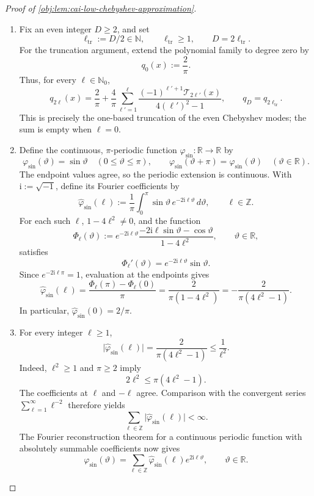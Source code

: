 \begin{proof}[Proof of \cref{obj:lem:cai-low-chebyshev-approximation}]
\begin{enumerate}
\item Fix an even integer \(D\ge2\), and set
\[
\ell_{\mathrm{tr}}:=D/2\in\mathbb N,\qquad
\ell_{\mathrm{tr}}\ge1,\qquad D=2\ell_{\mathrm{tr}}.
\]
For the truncation argument, extend the polynomial family to degree zero by
\[
q_0(x):=\frac2\pi.
\]
Thus, for every \(\ell\in\mathbb N_0\),
\[
q_{2\ell}(x)
=\frac2\pi+\frac4\pi\sum_{\ell'=1}^{\ell}
 \frac{(-1)^{\ell'+1}\mathcal T_{2\ell'}(x)}
 {4(\ell')^2-1},
\qquad q_D=q_{2\ell_{\mathrm{tr}}}.
\]
This is precisely the one-based truncation of the even Chebyshev modes; the sum is empty when \(\ell=0\).

\item Define the continuous, \(\pi\)-periodic function \(\varphi_{\sin}:\mathbb R\to\mathbb R\) by
\[
\varphi_{\sin}(\vartheta)=\sin\vartheta
\quad(0\le\vartheta\le\pi),\qquad
\varphi_{\sin}(\vartheta+\pi)=\varphi_{\sin}(\vartheta)
\quad(\vartheta\in\mathbb R).
\]
The endpoint values agree, so the periodic extension is continuous. With \(\mathrm i:=\sqrt{-1}\), define its Fourier coefficients by
\[
\widehat\varphi_{\sin}(\ell)
:=\frac1\pi\int_0^\pi
 \sin\vartheta\,e^{-2\mathrm i\ell\vartheta}\,d\vartheta,
\qquad \ell\in\mathbb Z.
\]
For each such \(\ell\), \(1-4\ell^2\ne0\), and the function
\[
\Phi_\ell(\vartheta)
:=e^{-2\mathrm i\ell\vartheta}
 \frac{-2\mathrm i\ell\sin\vartheta-\cos\vartheta}
 {1-4\ell^2},
\qquad \vartheta\in\mathbb R,
\]
satisfies
\[
\Phi_\ell'(\vartheta)
=e^{-2\mathrm i\ell\vartheta}\sin\vartheta.
\]
Since \(e^{-2\mathrm i\ell\pi}=1\), evaluation at the endpoints gives
\[
\widehat\varphi_{\sin}(\ell)
=\frac{\Phi_\ell(\pi)-\Phi_\ell(0)}{\pi}
=\frac{2}{\pi(1-4\ell^2)}
=-\frac{2}{\pi(4\ell^2-1)}.
\]
In particular, \(\widehat\varphi_{\sin}(0)=2/\pi\).

\item For every integer \(\ell\ge1\),
\[
\bigl|\widehat\varphi_{\sin}(\ell)\bigr|
=\frac{2}{\pi(4\ell^2-1)}
\le\frac1{\ell^2}.
\]
Indeed, \(\ell^2\ge1\) and \(\pi\ge2\) imply
\[
2\ell^2\le\pi(4\ell^2-1).
\]
The coefficients at \(\ell\) and \(-\ell\) agree. Comparison with the convergent series \(\sum_{\ell=1}^\infty\ell^{-2}\) therefore yields
\[
\sum_{\ell\in\mathbb Z}
 \bigl|\widehat\varphi_{\sin}(\ell)\bigr|<\infty.
\]
The Fourier reconstruction theorem for a continuous periodic function with absolutely summable coefficients now gives
\[
\varphi_{\sin}(\vartheta)
=\sum_{\ell\in\mathbb Z}
 \widehat\varphi_{\sin}(\ell)e^{2\mathrm i\ell\vartheta},
\qquad \vartheta\in\mathbb R.
\]


\end{enumerate}
\end{proof}
